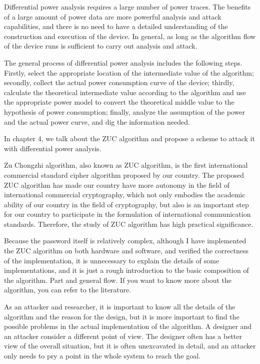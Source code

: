 \begin{bigabstract}
Differential power analysis requires a large number of power traces. The benefits of a large amount of power data are more powerful analysis and attack capabilities, and there is no need to have a detailed understanding of the construction and execution of the device. In general, as long as the algorithm flow of the device runs is sufficient to carry out analysis and attack.

The general process of differential power analysis includes the following steps. Firstly, select the appropriate location of the intermediate value of the algorithm; secondly, collect the actual power consumption curve of the device; thirdly, calculate the theoretical intermediate value according to the algorithm and use the appropriate power model to convert the theoretical middle value to the hypothesis of power consumption; finally, analyze the assumption of the power and the actual power curve, and dig the information needed.

In chapter 4, we talk about the ZUC algorithm and propose a scheme to attack it with differential power analysis.

Zu Chongzhi algorithm, also known as ZUC algorithm, is the first international commercial standard cipher algorithm proposed by our country. The proposed ZUC algorithm has made our country have more autonomy in the field of international commercial cryptography, which not only embodies the academic ability of our country in the field of cryptography, but also is an important step for our country to participate in the formulation of international communication standards. Therefore, the study of ZUC algorithm has high practical significance.

Because the password itself is relatively complex, although I have implemented the ZUC algorithm on both hardware and software, and verified the correctness of the implementation, it is unnecessary to explain the details of some implementations, and it is just a rough introduction to the basic composition of the algorithm. Part and general flow. If you want to know more about the algorithm, you can refer to the literature.

As an attacker and researcher, it is important to know all the details of the algorithm and the reason for the design, but it is more important to find the possible problems in the actual implementation of the algorithm. A designer and an attacker consider a different point of view. The designer often has a better view of the overall situation, but it is often unexcavated in detail, and an attacker only needs to pry a point in the whole system to reach the goal.


\end{bigabstract}

